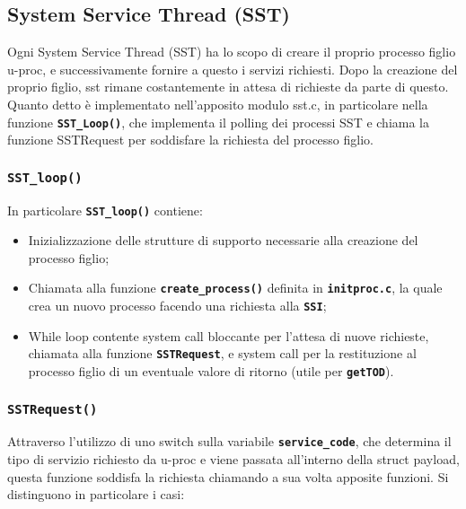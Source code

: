 \documentclass{article}
\begin{document}
\newpage
\subsection{System Service Thread (SST)}
Ogni System Service Thread (SST) ha lo scopo di creare il proprio processo figlio u-proc, e successivamente fornire a questo i servizi richiesti. Dopo la creazione del proprio figlio, sst rimane costantemente in attesa di richieste da parte di questo. Quanto detto è implementato nell'apposito modulo sst.c, in particolare nella funzione \texttt{\textbf{SST\_Loop()}}, che implementa il polling dei processi SST e chiama la funzione SSTRequest per soddisfare la richiesta del processo figlio.

 \subsubsection{\texttt{\textbf{SST\_loop()}}} 
 In particolare \texttt{\textbf{SST\_loop()}} contiene:
 \begin{itemize}
     \item Inizializzazione delle strutture di supporto necessarie alla creazione del processo figlio;
     \item Chiamata alla funzione \texttt{\textbf{create\_process()}} definita in \texttt{\textbf{initproc.c}}, la quale crea un nuovo processo facendo una richiesta alla \texttt{\textbf{SSI}};
     \item While loop contente system call bloccante per l’attesa di nuove richieste, chiamata alla funzione \texttt{\textbf{SSTRequest}}, e system call per la restituzione al processo figlio di un eventuale valore di ritorno (utile per \texttt{\textbf{getTOD}}).
 \end{itemize}

\subsubsection{\texttt{\textbf{SSTRequest()}}}
Attraverso l'utilizzo di uno switch sulla variabile \texttt{\textbf{service\_code}}, che determina il tipo di servizio richiesto da u-proc e viene passata all’interno della struct payload, questa funzione soddisfa la richiesta chiamando a sua volta apposite funzioni.
Si distinguono in particolare i casi:
\end{document}
